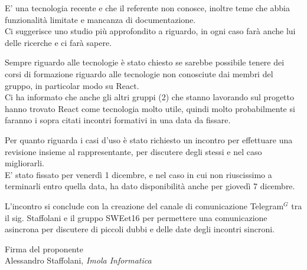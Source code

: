 \documentclass[a4paper, 11pt]{article}
\begin{document}
E' una tecnologia recente e che il referente non conosce, inoltre teme che abbia funzionalità limitate e mancanza di documentazione. \\
Ci suggerisce uno studio più approfondito a riguardo, in ogni caso farà anche lui delle ricerche e ci farà sapere.

Sempre riguardo alle tecnologie è stato chiesto se sarebbe possibile tenere dei corsi di formazione riguardo alle tecnologie non conosciute dai membri del gruppo, in particolar modo su React. \\
Ci ha informato che anche gli altri gruppi (2) che stanno lavorando sul progetto hanno trovato React come tecnologia molto utile,
 quindi molto probabilmente si faranno i sopra citati incontri formativi in una data da fissare.

Per quanto riguarda i casi d'uso è stato richiesto un incontro per effettuare una revisione insieme al rappresentante, per discutere degli stessi e nel caso migliorarli. \\
E' stato fissato per venerdì 1 dicembre, e nel caso in cui non riuscissimo a terminarli entro quella data, ha dato disponibilità anche per giovedì 7 dicembre.

L'incontro si conclude con la creazione del canale di comunicazione Telegram$^{G}$ tra il sig. Staffolani 
e il gruppo SWEet16 per permettere una comunicazione asincrona per discutere di piccoli dubbi e delle date degli incontri sincroni.




\vspace{100pt}
\begin{flushleft}
\hfill Firma del proponente \\
\vspace{50pt}
\hfill Alessandro Staffolani, \textit{Imola Informatica}
\end{flushleft}
\end{document}
